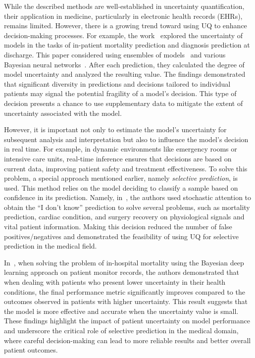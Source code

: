   While the described methods are well-established in uncertainty quantification, their application in medicine, particularly in electronic health records (EHRs), remains limited. However, there is a growing trend toward using UQ to enhance decision-making processes. For example, the work~\cite{10.1145/3368555.3384457} explored the uncertainty of models in the tasks of in-patient mortality prediction and diagnosis prediction at discharge. This paper considered using ensembles of models~\cite{lakshminarayanan2017simple} and various Bayesian neural networks~\cite{DBLP:journals/corr/FortunatoBV17}.   After each prediction, they calculated the degree of model uncertainty and analyzed the resulting value. The findings demonstrated that significant diversity in predictions and decisions tailored to individual patients may signal the potential fragility of a model's decision. This type of decision presents a chance to use supplementary data to mitigate the extent of uncertainty associated with the model.
  
  However, it is important not only to estimate the model's uncertainty for subsequent analysis and interpretation but also to influence the model's decision in real time. For example, in dynamic environments like emergency rooms or intensive care units, real-time inference ensures that decisions are based on current data, improving patient safety and treatment effectiveness. To solve this problem, a special approach mentioned earlier, namely \textit{selective prediction}, is used. This method relies on the model deciding to classify a sample based on confidence in its prediction. Namely, in~\cite{heo2018uncertaintyaware}, the authors used stochastic attention to obtain the ``I don't know'' prediction to solve several problems, such as mortality prediction, cardiac condition, and surgery recovery on physiological signals and vital patient information. Making this decision reduced the number of false positives/negatives and demonstrated the feasibility of using UQ for selective prediction in the medical field.
  
  In~\cite{qiu2019modeling}, when solving the problem of in-hospital mortality using the Bayesian deep learning approach on patient monitor records, the authors demonstrated that when dealing with patients who present lower uncertainty in their health conditions, the final performance metric significantly improves compared to the outcomes observed in patients with higher uncertainty. This result suggests that the model is more effective and accurate when the uncertainty value is small. These findings highlight the impact of patient uncertainty on model performance and underscore the critical role of selective prediction in the medical domain, where careful decision-making can lead to more reliable results and better overall patient outcomes.

